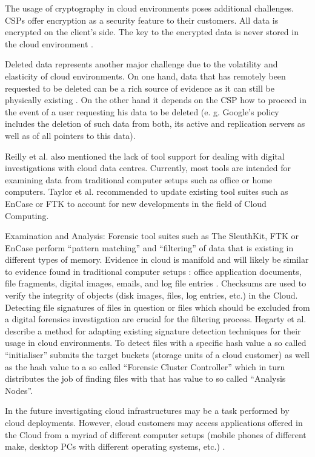 \documentclass[runningheads,a4paper]{llncs}
\begin{document}
The usage of cryptography in cloud environments poses additional challenges. CSPs offer encryption as a security feature to their customers. All data is encrypted on the client's side. The key to the encrypted data is never stored in the cloud environment \cite{Agudo2011}. 

Deleted data represents another major challenge due to the volatility and elasticity of cloud environments. On one hand, data that has remotely been requested to be deleted can be a rich source of evidence as it can still be physically existing \cite{Grispos2011}. On the other hand it depends on the CSP how to proceed in the event of a user requesting his data to be deleted \cite{Birk2011,Zimmerman2011} (e. g. Google's policy includes the deletion of such data from both, its active and replication servers as well as of all pointers to this data). 

Reilly et al. \cite{Reilly2010} also mentioned the lack of tool support for dealing with digital investigations with cloud data centres. Currently, most tools are intended for examining data from traditional computer setups such as office or home computers. Taylor et al. \cite{Taylor2011} recommended to update existing tool suites such as EnCase or FTK to account for new developments in the field of Cloud Computing. 

Examination and Analysis: Forensic tool suites such as The SleuthKit, FTK or EnCase perform ``pattern matching'' and ``filtering'' of data that is existing in different types of memory. Evidence in cloud is manifold and will likely be similar to evidence found in traditional computer setups \cite{Grispos2011}: office application documents, file fragments, digital images, emails, and log file entries \cite{Marty2011}. Checksums are used to verify the integrity of objects (disk images, files, log entries, etc.) in the Cloud. Detecting file signatures of files in question or files which should be excluded from a digital forensics investigation are crucial for the filtering process. Hegarty et al. \cite{Hegarty2011} describe a method for adapting existing signature detection techniques for their usage in cloud environments. To detect files with a specific hash value a so called ``initialiser'' submits the target buckets (storage units of a cloud customer) as well as the hash value to a so called ``Forensic Cluster Controller'' which in turn distributes the job of finding files with that has value to so called ``Analysis Nodes''.

In the future investigating cloud infrastructures may be a task performed by cloud deployments. However, cloud customers may access applications offered in the Cloud from a myriad of different computer setups (mobile phones of different make, desktop PCs with different operating systems, etc.) \cite{Taylor2011}. 
\end{document}
